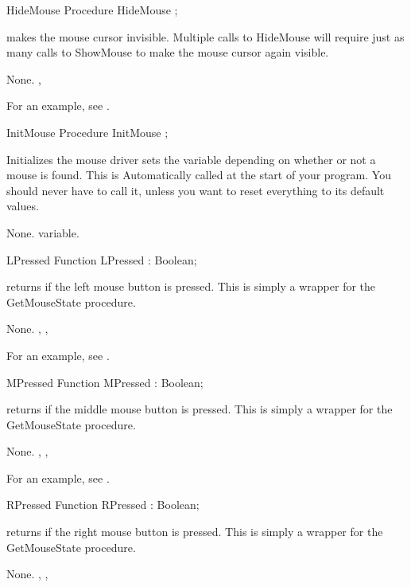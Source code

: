 \html{}
\begin{procedure}{HideMouse}
\Declaration
Procedure HideMouse ;

\Description

 makes the mouse cursor invisible.
Multiple calls to HideMouse will require just as many calls to ShowMouse to
make the mouse cursor again visible.

\Errors
None.
\SeeAlso
{}, 
\end{procedure}
For an example, see .
\begin{procedure}{InitMouse}
\Declaration
Procedure InitMouse ;

\Description

Initializes the mouse driver sets the variable  depending on
whether or not a mouse is found.
This is Automatically called at the start of your program. 
You should never have to call it, unless you want to reset everything to 
its default values.

\Errors
None.
\SeeAlso
{} variable.
\end{procedure}
\html{}
\begin{function}{LPressed}
\Declaration
Function LPressed  : Boolean;

\Description

 returns  if the left mouse button is pressed.
This is simply a wrapper for the GetMouseState procedure.

\Errors
None.
\SeeAlso
{}, , 
\end{function}
For an example, see .
\begin{function}{MPressed}
\Declaration
Function MPressed  : Boolean;

\Description

 returns  if the middle mouse button is pressed.
This is simply a wrapper for the GetMouseState procedure.

\Errors
None.
\SeeAlso
{}, , 
\end{function}
For an example, see .
\begin{function}{RPressed}
\Declaration
Function RPressed  : Boolean;

\Description

 returns  if the right mouse button is pressed.
This is simply a wrapper for the GetMouseState procedure.

\Errors
None.
\SeeAlso
{}, , 
\end{function}

